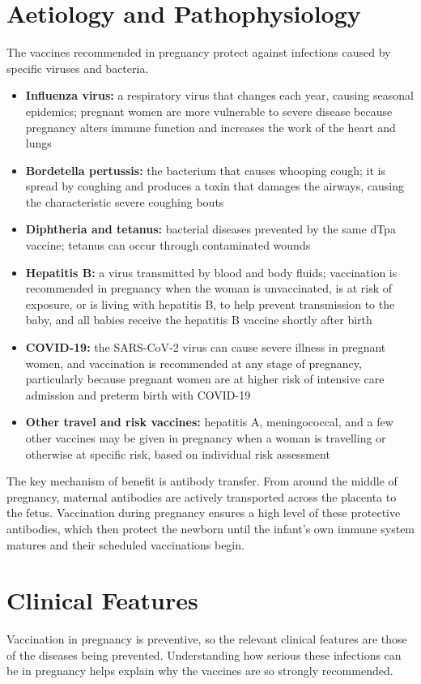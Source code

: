 \section*{Aetiology and Pathophysiology}
The vaccines recommended in pregnancy protect against infections caused by specific viruses and bacteria.

\begin{itemize}
    \item \textbf{Influenza virus:} a respiratory virus that changes each year, causing seasonal epidemics; pregnant women are more vulnerable to severe disease because pregnancy alters immune function and increases the work of the heart and lungs
    \item \textbf{Bordetella pertussis:} the bacterium that causes whooping cough; it is spread by coughing and produces a toxin that damages the airways, causing the characteristic severe coughing bouts
    \item \textbf{Diphtheria and tetanus:} bacterial diseases prevented by the same dTpa vaccine; tetanus can occur through contaminated wounds
    \item \textbf{Hepatitis B:} a virus transmitted by blood and body fluids; vaccination is recommended in pregnancy when the woman is unvaccinated, is at risk of exposure, or is living with hepatitis B, to help prevent transmission to the baby, and all babies receive the hepatitis B vaccine shortly after birth
    \item \textbf{COVID-19:} the SARS-CoV-2 virus can cause severe illness in pregnant women, and vaccination is recommended at any stage of pregnancy, particularly because pregnant women are at higher risk of intensive care admission and preterm birth with COVID-19
    \item \textbf{Other travel and risk vaccines:} hepatitis A, meningococcal, and a few other vaccines may be given in pregnancy when a woman is travelling or otherwise at specific risk, based on individual risk assessment
\end{itemize}

The key mechanism of benefit is antibody transfer. From around the middle of pregnancy, maternal antibodies are actively transported across the placenta to the fetus. Vaccination during pregnancy ensures a high level of these protective antibodies, which then protect the newborn until the infant's own immune system matures and their scheduled vaccinations begin.

\section*{Clinical Features}
Vaccination in pregnancy is preventive, so the relevant clinical features are those of the diseases being prevented. Understanding how serious these infections can be in pregnancy helps explain why the vaccines are so strongly recommended.

